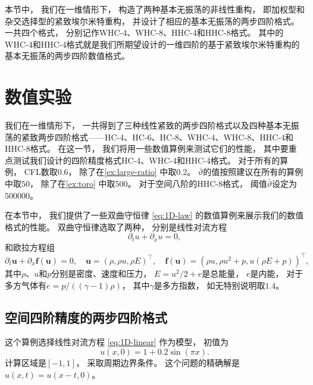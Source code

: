 \vspace{\baselineskip} %
本节中，
我们在一维情形下，
构造了两种基本无振荡的非线性重构，
即加权型和杂交选择型的紧致埃尔米特重构，
并设计了相应的基本无振荡的两步四阶格式。
一共四个格式，
分别记作WHC-4、WHC-8、HHC-4和HHC-8格式。
其中的WHC-4和HHC-4格式就是我们所期望设计的一维四阶的基于紧致埃尔米特重构的基本无振荡的两步四阶数值格式。

\section{数值实验}
\label{sec:1D-examples}

我们在一维情形下，
一共得到了三种线性紧致的两步四阶格式以及四种基本无振荡的紧致两步四阶格式——HC-4、HC-6、HC-8、WHC-4、WHC-8、HHC-4和HHC-8格式。
在这一节，
我们将用一些数值算例来测试它们的性能，
其中要重点测试我们设计的四阶精度格式HC-4、WHC-4和HHC-4格式。
对于所有的算例，
CFL数取$0.6$，
除了在\cref{ex:large-ratio} 中取$0.2$。
$\bar\vartheta$的值按照建议在所有的算例中取$50$，
除了在\cref{ex:toro} 中取$500$。
对于空间八阶的HHC-8格式，
阈值$\bar\vartheta$设定为$500000$。

在本节中，
我们提供了一些双曲守恒律 \cref{eq:1D-law} 的数值算例来展示我们的数值格式的性能。
双曲守恒律选取了两种，
分别是线性对流方程
\begin{equation}
  \label{eq:1D-linear}
  {\partial_{t}}u + {\partial_{x}}u = 0,
\end{equation}
和欧拉方程组
\begin{equation}
  \label{eq:1D-Euler}
  {\partial_{t}}{\bm{u}} + {\partial_{x}}{\bm{f}}({\bm{u}}) = 0, \quad
  {\bm{u}} =(\rho, \rho u, \rho E)^\top, \quad
  {\bm{f}}({\bm{u}}) =(\rho u,\rho u^2+p, u(\rho E+p))^\top,
\end{equation}
其中$\rho$、$u$和$p$分别是密度、速度和压力，
$E=u^2/2+e$是总能量，
$e$是内能，
对于多方气体有$e=p/((\gamma-1)\rho)$，
其中$\gamma$是多方指数，
如无特别说明取$1.4$。

\subsection{空间四阶精度的两步四阶格式}

\begin{example}[一维线性对流方程的精度测试]
  \label{ex:1D-acc1}
  这个算例选择线性对流方程 \cref{eq:1D-linear} 作为模型，
  初值为
  \begin{equation}
    u(x, 0) = 1 + 0.2\sin(\pi x).
  \end{equation}
  计算区域是$[-1,1]$，
  采取周期边界条件。
  这个问题的精确解是$u(x,t) = u(x-t,0)$。
\end{example}


